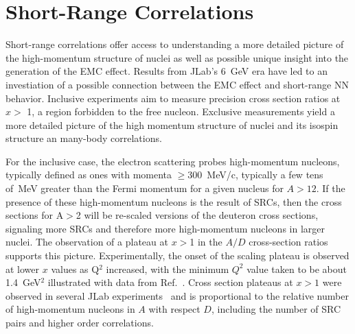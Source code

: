 \section{Short-Range Correlations\label{sec:srcs}}
Short-range correlations offer access to understanding a more detailed picture of the high-momentum structure of nuclei as well as possible unique insight into the generation of the EMC effect.  Results from JLab's 6~GeV era have led to an investiation of a possible connection between the EMC effect and short-range NN behavior.  Inclusive experiments aim to measure precision cross section ratios at $x >$ 1, a region forbidden to the free nucleon.  Exclusive measurements yield a more detailed picture of the high momentum structure of nuclei and its isospin structure an many-body correlations.

For the inclusive case, the electron scattering probes high-momentum nucleons, typically defined as ones with momenta $\ge$300~MeV/c, typically a few tens of~MeV greater than the Fermi momentum for a given nucleus for $A>12$.  If the presence of these high-momentum nucleons is the result of SRCs, then the cross sections for A$>$2 will be re-scaled versions of the deuteron cross sections, signaling more SRCs and therefore more high-momentum nucleons in larger nuclei.   The observation of a plateau at $x>$1 in the $A/D$ cross-section ratios supports this picture.    Experimentally, the onset of the scaling plateau is observed at lower $x$ values as Q$^2$ increased, with the minimum $Q^2$ value taken to be about 1.4~GeV$^2$ illustrated with data from Ref.~\cite{Egiyan:2003vg}.  Cross section plateaus at $x>1$ were observed in several JLab experiments~\cite{Egiyan:2003vg, Fomin:2011ng} and is proportional to the relative number of high-momentum nucleons in $A$ with respect $D$, including the number of SRC pairs and higher order correlations.   %


